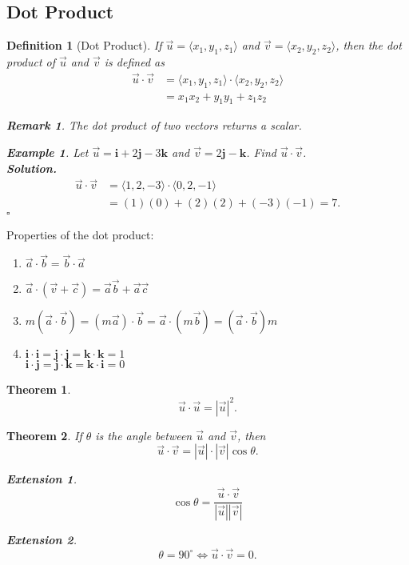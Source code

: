 \documentclass[12pt,a4paper]{article}
\newtheorem{thm}{Theorem}[subsection]
\newtheorem{df}{Definition}[subsection]
\newtheorem{eg}{Example}[subsection]
\newenvironment*{sol}{\indent\textbf{Solution. }}{\hfill{$\square$}\par}
\newtheorem*{rmk}{\indent Remark}
\newtheorem*{ext}{\indent Extension}
\def\vecv{\vec{v}}
\def\vecu{\vec{u}}
\def\veca{\vec{a}}
\def\vecb{\vec{b}}
\def\vecc{\vec{c}}
\def\veci{\boldsymbol{\textbf{i}}}
\def\vecj{\boldsymbol{\textbf{j}}}
\def\veck{\boldsymbol{\textbf{k}}}
\begin{document}
\subsection{Dot Product}
\begin{df}[Dot Product]
	If $\vecu=\langle x_1,y_1,z_1\rangle$ and $\vecv=\langle x_2,y_2,z_2\rangle$, then the dot product of $\vecu$ and $\vecv$ is defined as \[\begin{aligned}
		\vecu\cdot\vecv&=\langle x_1,y_1,z_1\rangle\cdot\langle x_2,y_2,z_2\rangle\\
		&=x_1x_2+y_1y_1+z_1z_2 
	\end{aligned}\]	
	\begin{rmk} The dot product of two vectors returns a scalar. \end{rmk}
	\begin{eg}
		Let $\vecu=\veci+2\vecj-3\veck$ and $\vecv=2\vecj-\veck$. Find $\vecu\cdot\vecv$.\\
		\begin{sol}
			\[\begin{aligned}
			\vecu\cdot\vecv&=\langle1,2,-3\rangle\cdot\langle0,2,-1\rangle\\
				&=(1)(0)+(2)(2)+(-3)(-1)=7.
			\end{aligned}\]	
		\end{sol}
	\end{eg}
\end{df}
Properties of the dot product: 
\begin{enumerate}
	\item $\veca\cdot\vecb=\vecb\cdot\veca$
	\item $\veca\cdot(\vecv+\vecc)=\veca\vecb+\veca\vecc$
	\item $m(\veca\cdot\vecb)=(m\veca)\cdot\vecb=\veca\cdot(m\vecb)=(\veca\cdot\vecb)m$
	\item $\veci\cdot\veci=\vecj\cdot\vecj=\veck\cdot\veck=1$\\$\veci\cdot\vecj=\vecj\cdot\veck=\veck\cdot\veci=0$
\end{enumerate}
\begin{thm}
	\[\vecu\cdot\vecu=|\vecu|^2.\]	
\end{thm}
\begin{thm}
	If $\theta$ is the angle between $\vecu$ and $\vecv$, then \[\boxed{\vecu\cdot\vecv=|\vecu|\cdot|\vecv|\cos\theta}.\]
	\begin{ext} \[\cos\theta=\frac{\vecu\cdot\vecv}{|\vecu||\vecv|}\]\end{ext}
	\begin{ext} \[\theta=90^\circ\Longleftrightarrow\vecu\cdot\vecv=0.\]	\end{ext}
\end{thm}
\end{document}
